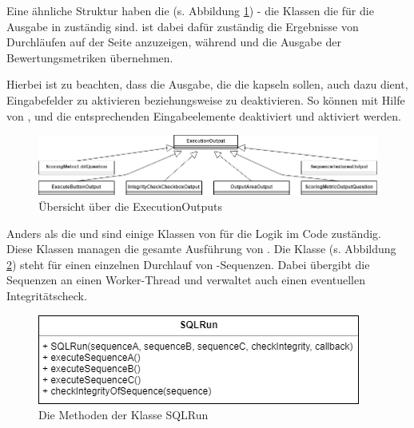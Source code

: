 Eine ähnliche Struktur haben die  (s. Abbildung \ref{fig:execution-outputs}) - die Klassen die für die Ausgabe in  zuständig sind.  ist dabei dafür zuständig die Ergebnisse von  Durchläufen auf der Seite anzuzeigen, während  und  die Ausgabe der Bewertungsmetriken übernehmen.

Hierbei ist zu beachten, dass die Ausgabe, die die  kapseln sollen, auch dazu dient, Eingabefelder zu aktivieren beziehungsweise zu deaktivieren. So können mit Hilfe von ,  und  die entsprechenden Eingabeelemente deaktiviert und aktiviert werden.
    
    \begin{figure}[H]
        \begin{center}
            \includegraphics[page=1, width=0.7\paperwidth, trim=0 0 0 0, clip]{fig/ExecutionOutputs.png} 
            \caption{Übersicht über die ExecutionOutputs}
            \label{fig:execution-outputs}
        \end{center}
    \end{figure}

Anders als die  und  sind einige Klassen von  für die Logik im  Code zuständig. Diese Klassen managen die gesamte Ausführung von . Die Klasse  (s. Abbildung \ref{fig:sql-run}) steht für einen einzelnen Durchlauf von -Sequenzen. Dabei übergibt  die Sequenzen an einen  Worker-Thread und verwaltet auch einen eventuellen Integritätscheck.

    \begin{figure}[H]
        \begin{center}
            \includegraphics[page=1, width=0.5\paperwidth, trim=0 0 0 0, clip]{fig/SQLRun.png} 
            \caption{Die Methoden der Klasse SQLRun}
            \label{fig:sql-run}
        \end{center}
    \end{figure}

